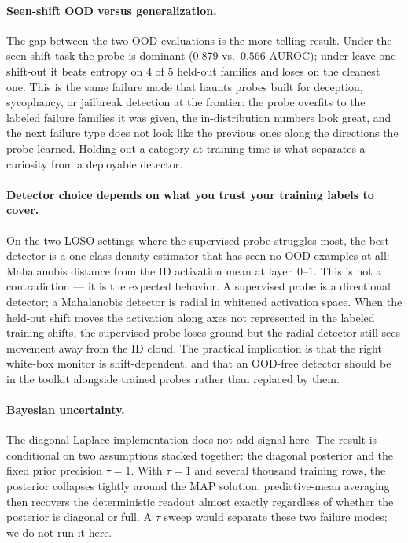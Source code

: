 \documentclass[11pt]{article}
\begin{document}
\paragraph{Seen-shift OOD versus generalization.}
The gap between the two OOD evaluations is the more telling result. Under the seen-shift task the probe is dominant ($0.879$ vs.\ $0.566$ AUROC); under leave-one-shift-out it beats entropy on $4$ of $5$ held-out families and loses on the cleanest one. This is the same failure mode that haunts probes built for deception, sycophancy, or jailbreak detection at the frontier: the probe overfits to the labeled failure families it was given, the in-distribution numbers look great, and the next failure type does not look like the previous ones along the directions the probe learned. Holding out a category at training time is what separates a curiosity from a deployable detector.

\paragraph{Detector choice depends on what you trust your training labels to cover.}
On the two LOSO settings where the supervised probe struggles most, the best detector is a one-class density estimator that has seen no OOD examples at all: Mahalanobis distance from the ID activation mean at layer~$0$--$1$. This is not a contradiction --- it is the expected behavior. A supervised probe is a directional detector; a Mahalanobis detector is radial in whitened activation space. When the held-out shift moves the activation along axes not represented in the labeled training shifts, the supervised probe loses ground but the radial detector still sees movement away from the ID cloud. The practical implication is that the right white-box monitor is shift-dependent, and that an OOD-free detector should be in the toolkit alongside trained probes rather than replaced by them.

\paragraph{Bayesian uncertainty.}
The diagonal-Laplace implementation does not add signal here. The result is conditional on two assumptions stacked together: the diagonal posterior and the fixed prior precision $\tau=1$. With $\tau=1$ and several thousand training rows, the posterior collapses tightly around the MAP solution; predictive-mean averaging then recovers the deterministic readout almost exactly regardless of whether the posterior is diagonal or full. A $\tau$ sweep would separate these two failure modes; we do not run it here.
\end{document}

